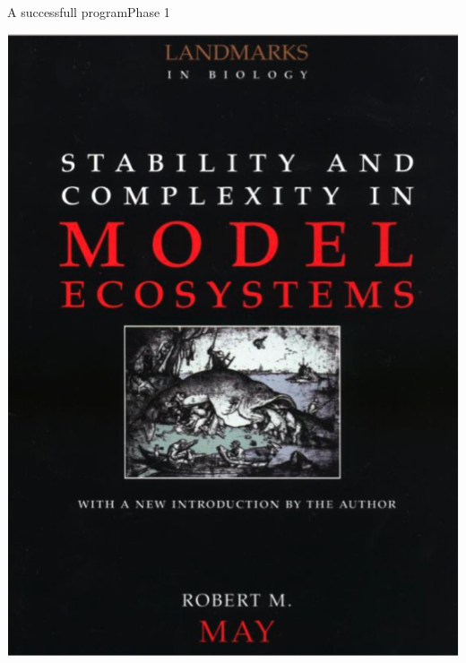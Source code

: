 \documentclass{eecslides}
\begin{document}

	\begin{frame}{A successfull program}{Phase 1}
		\begin{center}
		\includegraphics[height=0.65\textheight]{may}\\
		\end{center}	
	\end{frame}

\end{document}
